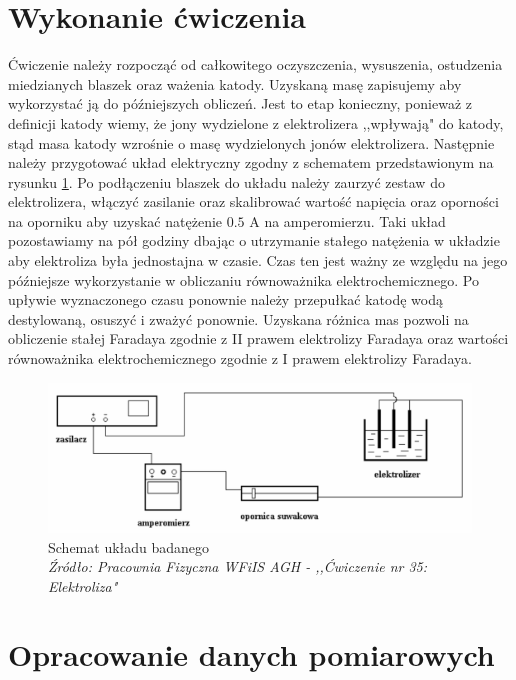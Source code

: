 \documentclass[a4paper,12pts]{article}
\begin{document}
	\section{Wykonanie ćwiczenia}
	Ćwiczenie należy rozpocząć od całkowitego oczyszczenia, wysuszenia, ostudzenia miedzianych blaszek oraz ważenia katody. Uzyskaną masę zapisujemy aby wykorzystać ją do późniejszych obliczeń. Jest to etap konieczny, ponieważ z definicji katody wiemy, że jony wydzielone z elektrolizera ,,wpływają" do katody, stąd masa katody wzrośnie o masę wydzielonych jonów elektrolizera. Następnie należy przygotować układ elektryczny zgodny z schematem przedstawionym na rysunku \ref{schemat_ukladu}. Po podłączeniu blaszek do układu należy zaurzyć zestaw do elektrolizera, włączyć zasilanie oraz skalibrować wartość napięcia oraz oporności na oporniku aby uzyskać natężenie $0.5$ A na amperomierzu. Taki układ pozostawiamy na pół godziny dbając o utrzymanie stałego natężenia w układzie aby elektroliza była jednostajna w czasie. Czas ten jest ważny ze względu na jego późniejsze wykorzystanie w obliczaniu równoważnika elektrochemicznego. Po upływie wyznaczonego czasu ponownie należy przepułkać katodę wodą destylowaną, osuszyć i zważyć ponownie. Uzyskana różnica mas pozwoli na obliczenie stałej Faradaya zgodnie z II prawem elektrolizy Faradaya oraz wartości równoważnika elektrochemicznego zgodnie z I prawem elektrolizy Faradaya.

	
	\begin{figure}[!h]
		\centering
		\includegraphics[scale=0.6]{schemat.png}
		\caption{Schemat układu badanego \\ \textit{Źródło: Pracownia Fizyczna WFiIS AGH - ,,Ćwiczenie nr 35: Elektroliza"}}
		\label{schemat_ukladu}
	\end{figure}
	
	
	\section{Opracowanie danych pomiarowych}
	
\end{document}
